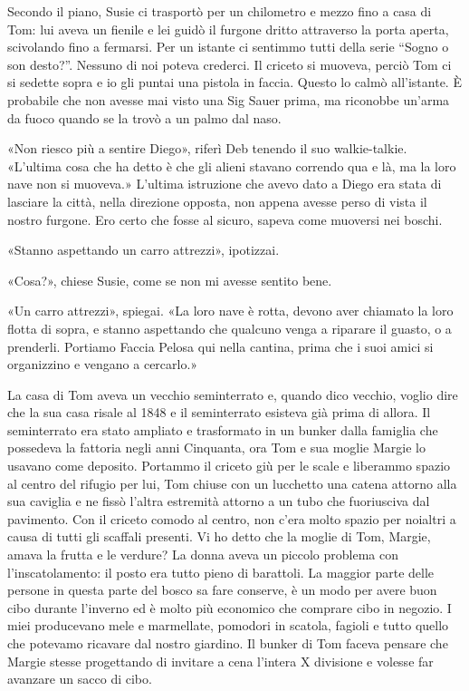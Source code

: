 Secondo il piano, Susie ci trasportò per un chilometro e mezzo fino a
casa di Tom: lui aveva un fienile e lei guidò il furgone dritto
attraverso la porta aperta, scivolando fino a fermarsi. Per un istante
ci sentimmo tutti della serie ``Sogno o son desto?''. Nessuno di noi
poteva crederci. Il criceto si muoveva, perciò Tom ci si sedette sopra e
io gli puntai una pistola in faccia. Questo lo calmò all'istante. È
probabile che non avesse mai visto una Sig Sauer prima, ma riconobbe
un'arma da fuoco quando se la trovò a un palmo dal naso.

«Non riesco più a sentire Diego», riferì Deb tenendo il suo
walkie-talkie. «L'ultima cosa che ha detto è che gli alieni stavano
correndo qua e là, ma la loro nave non si muoveva.» L'ultima istruzione
che avevo dato a Diego era stata di lasciare la città, nella direzione
opposta, non appena avesse perso di vista il nostro furgone. Ero certo
che fosse al sicuro, sapeva come muoversi nei boschi.

«Stanno aspettando un carro attrezzi», ipotizzai.

«Cosa?», chiese Susie, come se non mi avesse sentito bene.

«Un carro attrezzi», spiegai. «La loro nave è rotta, devono aver
chiamato la loro flotta di sopra, e stanno aspettando che qualcuno venga
a riparare il guasto, o a prenderli. Portiamo Faccia Pelosa qui nella
cantina, prima che i suoi amici si organizzino e vengano a cercarlo.»

La casa di Tom aveva un vecchio seminterrato e, quando dico vecchio,
voglio dire che la sua casa risale al 1848 e il seminterrato esisteva
già prima di allora. Il seminterrato era stato ampliato e trasformato in
un bunker dalla famiglia che possedeva la fattoria negli anni Cinquanta,
ora Tom e sua moglie Margie lo usavano come deposito. Portammo il
criceto giù per le scale e liberammo spazio al centro del rifugio per
lui, Tom chiuse con un lucchetto una catena attorno alla sua caviglia e
ne fissò l'altra estremità attorno a un tubo che fuoriusciva dal
pavimento. Con il criceto comodo al centro, non c'era molto spazio per
noialtri a causa di tutti gli scaffali presenti. Vi ho detto che la
moglie di Tom, Margie, amava la frutta e le verdure? La donna aveva un
piccolo problema con l'inscatolamento: il posto era tutto pieno di
barattoli. La maggior parte delle persone in questa parte del bosco sa
fare conserve, è un modo per avere buon cibo durante l'inverno ed è
molto più economico che comprare cibo in negozio. I miei producevano
mele e marmellate, pomodori in scatola, fagioli e tutto quello che
potevamo ricavare dal nostro giardino. Il bunker di Tom faceva pensare
che Margie stesse progettando di invitare a cena l'intera X divisione e
volesse far avanzare un sacco di cibo.

